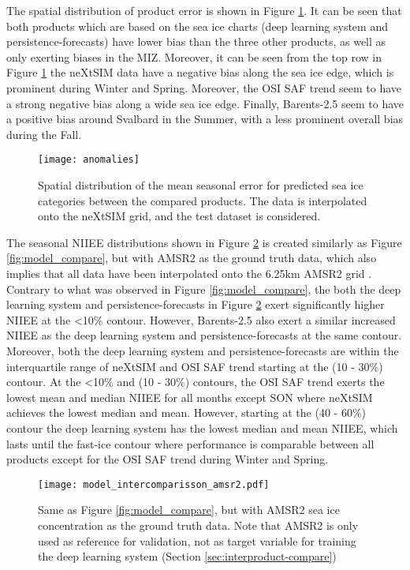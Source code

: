 \documentclass[../main/thesis.tex]{subfiles}
\begin{document}
The spatial distribution of product error is shown in Figure \ref{fig:anomalies}. It can be seen that both products which are based on the sea ice charts (deep learning system and persistence-forecasts) have lower bias than the three other products, as well as only exerting biases in the MIZ. Moreover, it can be seen from the top row in Figure \ref{fig:anomalies} the neXtSIM data have a negative bias along the sea ice edge, which is prominent during Winter and Spring. Moreover, the OSI SAF trend seem to have a strong negative bias along a wide sea ice edge. Finally, Barents-2.5 seem to have a positive bias around Svalbard in the Summer, with a less prominent overall bias during the Fall.

\begin{figure}
    \centering
    \texttt{[image: anomalies]}
    \caption{\label{fig:anomalies}Spatial distribution of the mean seasonal error for predicted sea ice categories between the compared products. The data is interpolated onto the neXtSIM grid, and the test dataset is considered.}
\end{figure}


The seasonal NIIEE distributions shown in Figure \ref{fig:model_compare_amsr2} is created similarly as Figure \ref{fig:model_compare}, but with AMSR2 as the ground truth data, which also implies that all data have been interpolated onto the 6.25km AMSR2 grid \citep{Spreen2008}. Contrary to what was observed in Figure \ref{fig:model_compare}, the both the deep learning system and persistence-forecasts in Figure \ref{fig:model_compare_amsr2} exert significantly higher NIIEE at the <10\% contour. However, Barents-2.5 also exert a similar increased NIIEE as the deep learning system and persistence-forecasts at the same contour. Moreover, both the deep learning system and persistence-forecasts are within the interquartile range of neXtSIM and OSI SAF trend starting at the (10 - 30\%) contour. At the <10\% and (10 - 30\%) contours, the OSI SAF trend exerts the lowest mean and median NIIEE for all months except SON where neXtSIM achieves the lowest median and mean. However, starting at the (40 - 60\%) contour the deep learning system has the lowest median and mean NIIEE, which lasts until the fast-ice contour where performance is comparable between all products except for the OSI SAF trend during Winter and Spring.

\begin{figure}
    \centering
    \texttt{[image: model\_intercomparisson\_amsr2.pdf]}
    \caption{\label{fig:model_compare_amsr2}Same as Figure \ref{fig:model_compare}, but with AMSR2 sea ice concentration as the ground truth data. Note that AMSR2 is only used as reference for validation, not as target variable for training the deep learning system (Section \ref{sec:interproduct-compare})}
\end{figure}
\end{document}
